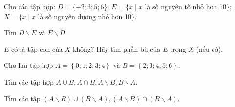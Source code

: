 \begin{vd}%
	Cho các tập hợp: $D=\{-2 ; 3 ; 5 ; 6\}$; $E=\{x \mid x$ là số nguyên tố nhỏ hơn 10$\}$; $X=\{x \mid x$ là số nguyên dương nhỏ hơn 10$\}$.
	\begin{enumEX}{1}
		\item Tìm $D \backslash E$ và $E \backslash D$.
		\item $E$ có là tập con của $X$ không? Hãy tìm phần bù của $E$ trong $X$ (nếu có).
	\end{enumEX}
\end{vd}

\begin{vd}%
	Cho hai tập hợp $A=\left\{0;1;2;3;4\right\}$ và $B=\left\{2;3;4;5;6\right\}$.
	\begin{enumEX}{1}
		\item Tìm các tập hợp $A\cup B, A\cap B, A\backslash B, B\backslash A$.
		\item  Tìm các tập $\left(A\backslash B\right)\cup \left(B\backslash A\right), \left(A\backslash B\right)\cap \left(B\backslash A\right)$.
	\end{enumEX}
\end{vd}
